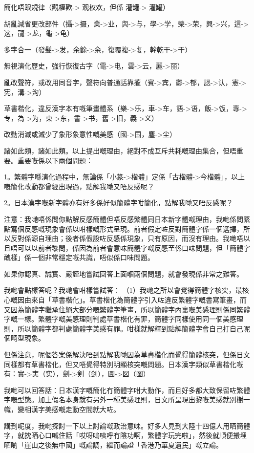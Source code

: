 簡化唔跟規律（觀權歡-> 观权欢，但係 灌罐-> 灌罐）

胡亂減省更改部件（攝->摄，業->业，與->与，學->学，榮->荣，興->兴，這->这，龍->龙，龜->龟）

多字合一（發髮->发，余餘->余，復覆複->复，幹乾干->干）

無視演化歷史，強行恢復古字（電->电，雲->云，麗->丽）

亂改聲符，或改用同音字，聲符向普通話靠攏（賓->宾，鬱->郁，認->认，憲->宪，溝->沟）

草書楷化，違反漢字本有嘅筆畫體系（樂->乐，車->车，語->语，飯->饭，專->专，為->为，東->东，書->书，舊->旧，義->义）

改動消滅或減少了象形象意性嘅美感（國->国，塵->尘）

諸如此類，諸如此類。以上提出嘅理由，絕對不成互斥共耗嘅理由集合，但唔重要。重要嘅係以下兩個問題：

1。繁體字喺演化過程中，無論係「小篆->楷體」定係「古楷體->今楷體」，以上嘅簡化改動都曾經出現過，點解我哋又唔反感呢？

2。日本漢字嘅新字體亦有好多係好似簡體字咁簡化，點解我哋又唔反感呢？

注意：我哋唔係問你點解反感簡體但唔反感繁體同日本新字體嘅理由，我哋係問緊點寫個反感嘅現象會係以咁樣嘅形式呈現。前者假定咗反對簡體字係一個選擇，所以反對係源自理由；後者係假設咗反感係現象，只有原因，而沒有理由。我哋唔以且唔可以以前者黎問，係因為前者會意味簡體字嘅反感至係口味問題，但「簡體字醜樣」係一個非常穩定嘅共識，唔似係口味問題。

如果你認真、誠實、嚴謹地嘗試回答上面嗰兩個問題，就會發現係非常之難答。

我哋會點樣答呢？我哋會咁樣嘗試答：
（1）我哋之所以會覺得簡體字核突，最核心嘅因由來自「草書楷化」。草書楷化為簡體字引入咗違反繁體字嘅書寫筆畫，而又因為簡體字繼承住絕大部分嘅繁體字筆畫，所以簡體字內裏嘅美感理則係同繁體字嘅一樣。繁體字嘅美感理則判處草書楷化有罪，簡體字同樣使用同一個美感理則，所以簡體字都判處簡體字美感有罪。咁樣就解釋到點解簡體字會自己打自己呢個畸型現象。

但係注意，呢個答案係解決唔到點解我哋因為草書楷化而覺得簡體核突，但係日文同樣都有草書楷化，但又唔覺得特別明顯核突嘅問題。日本漢字類似草書楷化嘅有：實->実（实），劍->剣（剑），圖->図（图）

我哋可以回答話：日本漢字嘅簡化冇簡體字咁大動作，而且好多都大致保留咗繁體字嘅型態。加上假名本身就有另外一種美感理則，日文所呈現出黎嘅美感就別樹一幟，變相漢字美感嘅走動空間就大咗。

講到呢度，我哋探討一下以上討論嘅政治意味。好多人見到大陸十四億人用晒簡體字，就抌晒心口喊住話「哎呀嗚咦呼冇陰功啊，繁體字玩完啦」，然後就順便搬埋晒啲「崖山之後無中國」嘅論調，繼而論證「香港乃華夏遺民」嘅立論。

